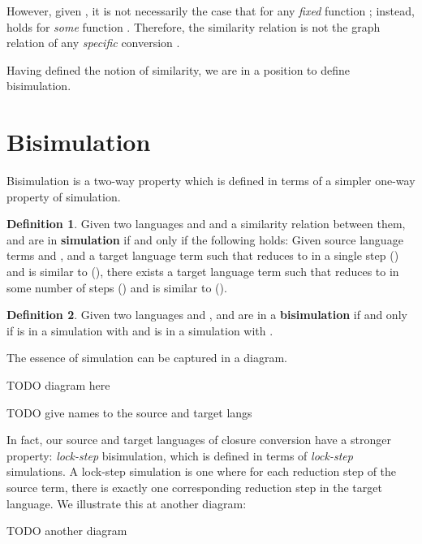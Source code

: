 \documentclass[bsc,frontabs,twoside,singlespacing,parskip,deptreport]{infthesis}
\theoremstyle{definition}
\newtheorem*{definition}{Definition}
\begin{document}
However, given , it is not
necessarily the case that  for any \textit{fixed}
function ; instead,  holds for \textit{some}
function . Therefore, the similarity relation is not the graph
relation of any \textit{specific} conversion .

Having defined the notion of similarity, we are in a position to
define bisimulation.

\section{Bisimulation}

Bisimulation is a two-way property which is defined in terms of a
simpler one-way property of simulation.

\begin{definition}{}
Given two languages  and  and a similarity relation
\AS{\_\textasciitilde\_}
between them,  and  are in \textbf{simulation} if and only
if the following holds:
Given source language terms  and , and a target language
term  such that  reduces to  in a single step () and
 is similar to  (), there exists a target
language term  such that  reduces to  in some
number of steps () and  is similar to  ().
\end{definition}

\begin{definition}
Given two languages  and ,   and  are in a
\textbf{bisimulation} if and only if  is in a simulation with  and
 is in a simulation with .
\end{definition}

The essence of simulation can be captured in a diagram.

TODO diagram here

TODO give names to the source and target langs

In fact, our source and target languages of closure conversion have a
stronger property: \textit{lock-step} bisimulation, which is defined
in terms of \textit{lock-step} simulations. A lock-step simulation is
one where for each reduction step of the source term, there is exactly
one corresponding reduction step in the target language. We illustrate
this at another diagram:

TODO another diagram
\end{document}
